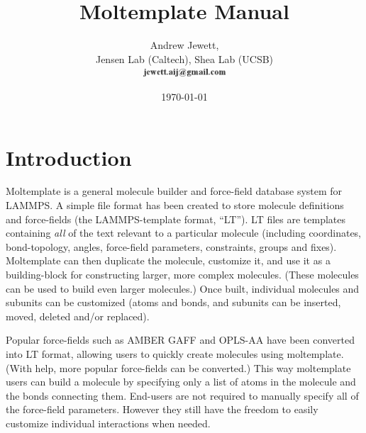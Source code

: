\documentclass[11pt]{article}
\begin{document}
\author{
  Andrew Jewett, \\
  Jensen Lab (Caltech), Shea Lab (UCSB) \\
\includegraphics[height=0.3cm]{author_email.png}
}
\date \today


\title{Moltemplate Manual}



\maketitle


\tableofcontents


\section{Introduction}

Moltemplate is a general molecule builder and force-field database system for LAMMPS.  A simple file format has been created to store molecule definitions and force-fields (the LAMMPS-template format, “LT”). 
LT files are templates containing \textit{all} of the text relevant to a particular molecule (including coordinates, bond-topology, angles, force-field parameters, constraints, groups and fixes).  Moltemplate can then duplicate the molecule, customize it, and use it as a building-block for constructing larger, more complex molecules.  (These molecules can be used to build even larger molecules.)  Once built, individual molecules and subunits can be customized (atoms and bonds, and subunits can be inserted, moved, deleted and/or replaced).

Popular force-fields such as AMBER GAFF and OPLS-AA have been converted into LT format, allowing users to quickly create molecules using moltemplate.  (With help, more popular force-fields can be converted.)  This way moltemplate users can build a molecule by specifying only a list of atoms in the molecule and the bonds connecting them.  End-users are not required to manually specify all of the force-field parameters.  However they still have the freedom to easily customize individual interactions when needed.
\end{document}
